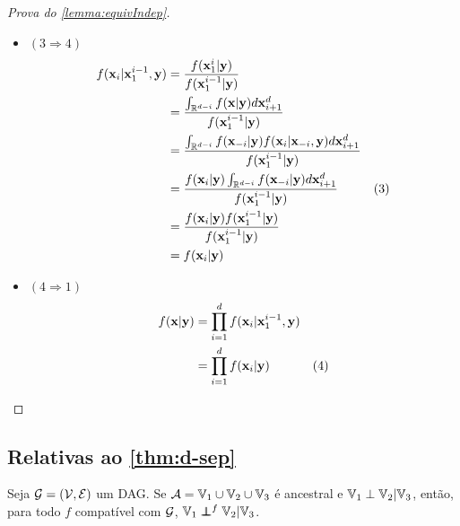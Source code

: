 \begin{proof}[Prova do \cref{lemma:equivIndep}]
\begin{itemize}
 \vspace{-5mm}
 \item $(3 \Longrightarrow 4)$
 \begin{align*}
  f(\x_i|\x_1^{i-1},\y)	
  &= \frac{f(\x_1^{i}|\y)}{f(\x_1^{i-1}|\y)} \\
	&= \frac{\int_{\mathbb{R}^{d-i}}{f(\x|\y)}d\x_{i+1}^{d}}
	{f(\x_1^{i-1}|\y)} \\
	&= \frac{\int_{\mathbb{R}^{d-i}}{f(\x_{-i}|\y)f(\x_i|\x_{-i},\y)d\x_{i+1}^{d}}}
	{f(\x_1^{i-1}|\y)} \\
	&= \frac{f(\x_i|\y)\int_{\mathbb{R}^{d-i}}{f(\x_{-i}|\y)d\x_{i+1}^{d}}}
	{f(\x_1^{i-1}|\y)} & (3) \\
	&= \frac{f(\x_i|\y)f(\x_1^{i-1}|\y)}
	{f(\x_1^{i-1}|\y)} \\
	&= f(\x_i|\y)
 \end{align*}

 \item $(4 \Longrightarrow 1)$
 \begin{align*}
  f(\x|\y)	
  &= \prod_{i=1}^{d}{f(\x_i|\x_1^{i-1},\y)} \\
	&= \prod_{i=1}^{d}{f(\x_i|\y)} & (4)
 \end{align*}
 \end{itemize}
\end{proof}

\subsection{Relativas ao \cref{thm:d-sep}}

\begin{lemma}
 \label{lem:dsep_indep_anc}
 Seja $\sG = (\sV, \sE)$ um DAG.
 Se $\sA = \V_1 \cup \V_2 \cup \V_3$ é ancestral e
 $\V_1 \perp \V_2 | \V_3$, então, 
 para todo $f$ compatível com $\sG$,
 $\V_1 \ind^f \V_2 | \V_3$.
\end{lemma}

